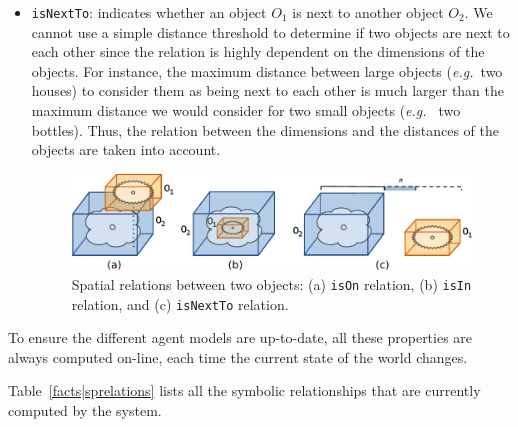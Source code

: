 \documentclass{svmult}
\newcommand{\concept}[1]{{\footnotesize \texttt{#1}}}
\newcommand{\eg}{{\textit{e.g.~}}}
\begin{document}
\begin{itemize}
\begin{itemize}
	\item \concept{isNextTo}: indicates whether an object $O_1$ is next to another
	object $O_2$. We cannot use a simple distance threshold to determine if two
	objects are next to each other since the relation is highly dependent on the
	dimensions of the objects. For instance, the maximum distance between large
	objects (\eg two houses) to consider them as being next to each other is much
	larger than the maximum distance we would consider for two small objects (\eg
	two bottles). Thus, the relation between the dimensions and the distances of
	the objects are taken into account.  

\begin{figure} 
	\centering
	\includegraphics[width=0.95\columnwidth]{figs/spatial_relation.pdf}
	\caption{Spatial relations between two objects: (a) \concept{isOn} relation, 
	(b) \concept{isIn} relation, and (c) \concept{isNextTo} relation.} 
	\label{fig|sprelations} 
\end{figure}

\end{itemize} 
\end{itemize}

To ensure the different agent models are up-to-date, all these properties are
always computed on-line, each time the current state of the world changes.

Table~\ref{facts|sprelations} lists all the symbolic relationships that are
currently computed by the system.
\end{document}
